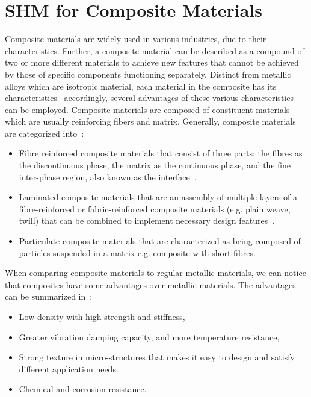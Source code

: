\section[SHM for Composite Materials]{SHM for Composite Materials}
\label{sec21}
Composite materials are widely used in various industries, due to their characteristics. 
Further, a composite material can be described as a compound of two or more different materials to achieve new features that cannot be achieved by those of specific components functioning separately.
Distinct from metallic alloys which are isotropic material, each material in the composite has its characteristics~\cite{Campbell2010} accordingly, several advantages of these various characteristics can be employed. 
Composite materials are composed of constituent materials which are usually reinforcing fibers and matrix.
Generally, composite materials are categorized into~\cite{Jones1999}:

\begin{itemize}
	\item Fibre reinforced composite materials that consist of three parts: the 
	fibres as the discontinuous phase, the matrix as the continuous phase, and the fine inter-phase region, also known as the interface~\cite{Cantwell1991}.
	\item Laminated composite materials that are an assembly of multiple layers of a fibre-reinforced or fabric-reinforced composite materials (e.g. plain weave, twill) that can be combined to implement necessary design features~\cite{Ramirez1999}.
	\item Particulate composite materials that are characterized as being composed of particles suspended in a matrix e.g. composite with short fibres.
	
\end{itemize}

When comparing composite materials to regular metallic materials, we can notice 
that composites have some advantages over metallic materials. 
The advantages can be summarized in~\cite{Campbell2010}:

\begin{itemize}
	\item Low density with high strength and stiffness, 
	\item Greater vibration damping capacity, and more temperature resistance,
	\item Strong texture in micro-structures that makes it easy to design and 
	satisfy different application needs. 
	\item Chemical and corrosion resistance.	
\end{itemize}

